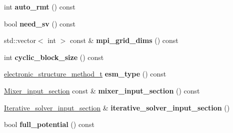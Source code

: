 \begin{DoxyCompactItemize}
\item 
\hypertarget{classsirius_1_1_simulation__parameters_a8268e73535676fb7214f6013a7e9377c}{}int {\bfseries auto\+\_\+rmt} () const \label{classsirius_1_1_simulation__parameters_a8268e73535676fb7214f6013a7e9377c}

\item 
\hypertarget{classsirius_1_1_simulation__parameters_acacd53e3d0be0851648f919d5a1b5746}{}bool {\bfseries need\+\_\+sv} () const \label{classsirius_1_1_simulation__parameters_acacd53e3d0be0851648f919d5a1b5746}

\item 
\hypertarget{classsirius_1_1_simulation__parameters_a88e137f3f5c336f1c33af5add5639715}{}std\+::vector$<$ int $>$ const \& {\bfseries mpi\+\_\+grid\+\_\+dims} () const \label{classsirius_1_1_simulation__parameters_a88e137f3f5c336f1c33af5add5639715}

\item 
\hypertarget{classsirius_1_1_simulation__parameters_acded03e7597b9accf11f525fd8114965}{}int {\bfseries cyclic\+\_\+block\+\_\+size} () const \label{classsirius_1_1_simulation__parameters_acded03e7597b9accf11f525fd8114965}

\item 
\hypertarget{classsirius_1_1_simulation__parameters_a1e86dd70e40b2ee881d42d38fc207610}{}\hyperlink{typedefs_8h_ad0240253ab18ec5b88c5e78866b1128a}{electronic\+\_\+structure\+\_\+method\+\_\+t} {\bfseries esm\+\_\+type} () const \label{classsirius_1_1_simulation__parameters_a1e86dd70e40b2ee881d42d38fc207610}

\item 
\hypertarget{classsirius_1_1_simulation__parameters_a9a20beac7bbf29a5b1ac098c0c6e61c1}{}\hyperlink{structsirius_1_1_mixer__input__section}{Mixer\+\_\+input\+\_\+section} const \& {\bfseries mixer\+\_\+input\+\_\+section} () const \label{classsirius_1_1_simulation__parameters_a9a20beac7bbf29a5b1ac098c0c6e61c1}

\item 
\hypertarget{classsirius_1_1_simulation__parameters_a5b7967baec4714565ffb1da2500ab2dc}{}\hyperlink{structsirius_1_1_iterative__solver__input__section}{Iterative\+\_\+solver\+\_\+input\+\_\+section} \& {\bfseries iterative\+\_\+solver\+\_\+input\+\_\+section} ()\label{classsirius_1_1_simulation__parameters_a5b7967baec4714565ffb1da2500ab2dc}

\item 
\hypertarget{classsirius_1_1_simulation__parameters_a61d00fd7f4534ed58ac91341144abe79}{}bool {\bfseries full\+\_\+potential} () const \label{classsirius_1_1_simulation__parameters_a61d00fd7f4534ed58ac91341144abe79}


\end{DoxyCompactItemize}
